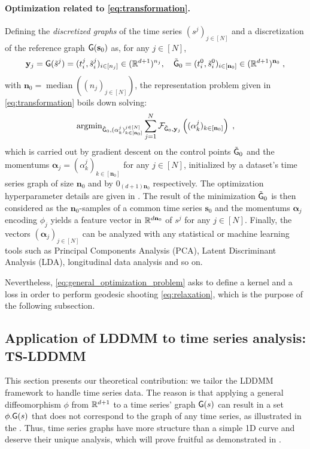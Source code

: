 \paragraph{Optimization related to \eqref{eq:transformation}.}
Defining the \textit{discretized graphs} of the time series $(s^j)_{j\in[N]}$ and a discretization of the reference graph $\mathsf{G}(\mathbf{s}_0)$ as, for any $j\in[N]$,
\begin{equation}
  \label{eq:descretized_graph}
  \mathbf{y}_j=\mathsf{G}(\tilde{s}^j)=(t_i^j,\tilde{s}^j_i)_{ i\in[n_j]}\in (\mathbb{R}^{d+1})^{n_j},\quad \tilde{\mathsf{G}}_0=(t_i^0,\tilde{s}^0_i)_{i\in[\mathbf{n}_0]}\in (\mathbb{R}^{d+1})^{\mathbf{n}_0} \; ,
\end{equation}
with $\mathbf{n}_0=\operatorname{median}((n_j)_{j\in[N]})$, the representation problem given in \eqref{eq:transformation} boils down solving:
\begin{equation}
  \label{eq:general_optimization_problem}
  \operatorname{argmin}_{\tilde{\mathsf{G}}_0,(\alpha_k^j)_{k\in [\mathbf{n}_0]}^{j\in[N]}} \sum_{j=1}^N \mathcal{F}_{\tilde{\mathsf{G}}_0,\mathbf{y}_j}\left((\alpha_k^j)_{k\in [\mathbf{n}_0]}\right)\; ,
\end{equation}
which is carried out by gradient descent on the control points $\tilde{\mathsf{G}}_0$ and the momentums $\mathbf{\alpha}_j=(\alpha_k^j)_{k\in [\mathbf{n}_0]}$ for any $j\in[N]$, initialized by a dataset's time series graph of size $\mathbf{n}_0$ and by $0_{(d+1)\mathbf{n}_0}$ respectively. The optimization hyperparameter details are given in . The result of the minimization $\tilde{\mathsf{G}}_0$ is then considered as the $\mathbf{n}_0$-samples of a common time series $\mathbf{s}_0$ and the momentums $\mathbf{\alpha}_j$ encoding $\phi_j$ yields a feature vector in $\mathbb{R}^{d \mathbf{n}_0} $ of $s^j$ for any $j\in[N]$. Finally, the vectors $(\mathbf{\alpha}_j)_{j\in[N]}$ can be analyzed with any statistical or machine learning tools such as Principal Components Analysis (PCA), Latent Discriminant Analysis (LDA), longitudinal data analysis and so on.

Nevertheless, \eqref{eq:general_optimization_problem} asks to define a kernel and a loss in order to perform geodesic shooting \eqref{eq:relaxation}, which is the purpose of the following subsection.

\vspace{-1ex}
\subsection{Application of LDDMM to time series analysis: TS-LDDMM}
\vspace{-1ex}
\label{section:time_series_specificity}
This section presents our theoretical contribution: we tailor the LDDMM framework to handle time series data. The reason is that applying a general diffeomorphism $\phi$ from $\mathbb{R}^{d+1}$ to a time series' graph $\mathsf{G}(s)$ can result in a set $\phi.\mathsf{G}(s)$ that does not correspond to the graph of any time series, as illustrated in the . Thus, time series graphs have more structure than a simple 1D curve \cite{glaunes2008large} and deserve their unique analysis, which will prove fruitful as demonstrated in .
       
